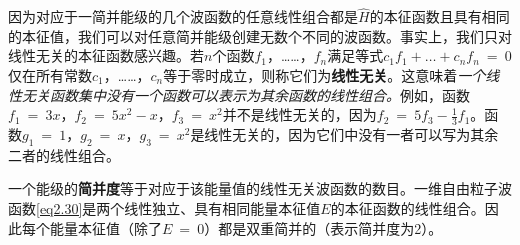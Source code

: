 \documentclass[12pt,a4paper,openany]{ctexbook}
\begin{document}
\begin{flushleft}
因为对应于一简并能级的几个波函数的任意线性组合都是$\hat{H}$的本征函数且具有相同的本征值，我们可以对任意简并能级创建无数个不同的波函数。事实上，我们只对线性无关的本征函数感兴趣。若$n$个函数$f_1$，……，$f_n$满足等式$c_1f_1+\dots+c_nf_n\ =\ 0$仅在所有常数$c_1$，……，$c_n$等于零时成立，则称它们为\textbf{线性无关}。这意味着\textit{一个线性无关函数集中没有一个函数可以表示为其余函数的线性组合。}例如，函数$f_1\ =\ 3x$，$f_2\ =\ 5x^2-x$，$f_3\ =\ x^2$并不是线性无关的，因为$f_2\ =\ 5f_3-\frac{1}{3}f_1$。函数$g_1\ =\ 1$，$g_2\ =\ x$，$g_3\ =\ x^2$是线性无关的，因为它们中没有一者可以写为其余二者的线性组合。

一个能级的\textbf{简并度}等于对应于该能量值的线性无关波函数的数目。一维自由粒子波函数\eqref{eq2.30}是两个线性独立、具有相同能量本征值$E$的本征函数的线性组合。因此每个能量本征值（除了$E\ =\ 0$）都是双重简并的（表示简并度为2）。
\end{flushleft}
\end{document}

